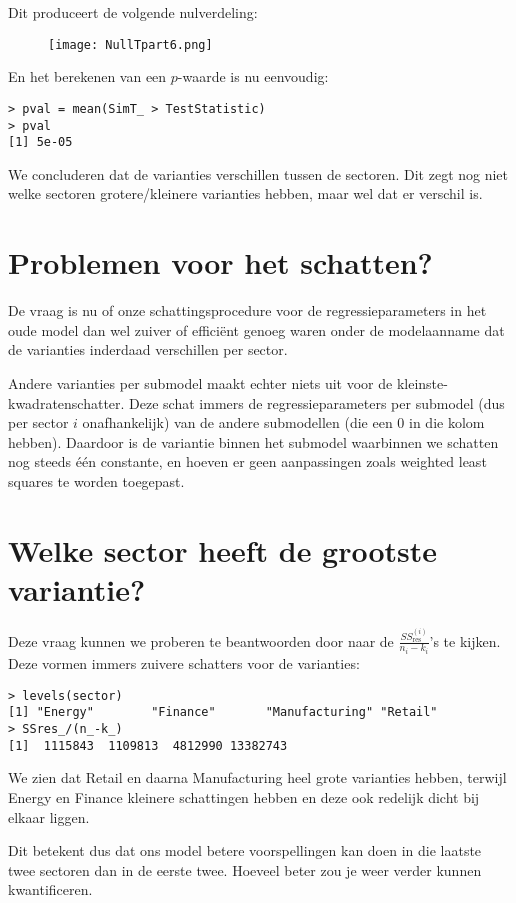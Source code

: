 \documentclass[a4paper]{report}
\begin{document}
  Dit produceert de volgende nulverdeling:
  \begin{figure}[H]
  \texttt{[image: NullTpart6.png]}
  \end{figure}
  
  En het berekenen van een $p$-waarde is nu eenvoudig:
  \begin{verbatim}
> pval = mean(SimT_ > TestStatistic) 
> pval
[1] 5e-05
  \end{verbatim}
  
  We concluderen dat de varianties verschillen tussen de sectoren. Dit zegt nog niet welke sectoren grotere/kleinere varianties hebben, maar wel dat er verschil is.
  
\section{Problemen voor het schatten?}
  De vraag is nu of onze schattingsprocedure voor de regressieparameters in het oude model dan wel zuiver of effici\"ent genoeg waren onder de modelaanname dat de varianties inderdaad verschillen per sector. 
  
  Andere varianties per submodel maakt echter niets uit voor de kleinste-kwadratenschatter. Deze schat immers de regressieparameters per submodel (dus per sector $i$ onafhankelijk) van de andere submodellen (die een 0 in die kolom hebben). Daardoor is de variantie binnen het submodel waarbinnen we schatten nog steeds \' e\' en constante, en hoeven er geen aanpassingen zoals weighted least squares te worden toegepast.
  
\section{Welke sector heeft de grootste variantie?}
  Deze vraag kunnen we proberen te beantwoorden door naar de $\frac{SS_{\text{res}}^{(i)}}{n_i-k_i}$'s te kijken. Deze vormen immers zuivere schatters voor de varianties:
  
  \begin{verbatim}
> levels(sector)
[1] "Energy"        "Finance"       "Manufacturing" "Retail"       
> SSres_/(n_-k_)
[1]  1115843  1109813  4812990 13382743 
  \end{verbatim}
  
  We zien dat Retail en daarna Manufacturing heel grote varianties hebben, terwijl Energy en Finance kleinere schattingen hebben en deze ook redelijk dicht bij elkaar liggen.
  
  Dit betekent dus dat ons model betere voorspellingen kan doen in die laatste twee sectoren dan in de eerste twee. Hoeveel beter zou je weer verder kunnen kwantificeren.
  
\end{document}
